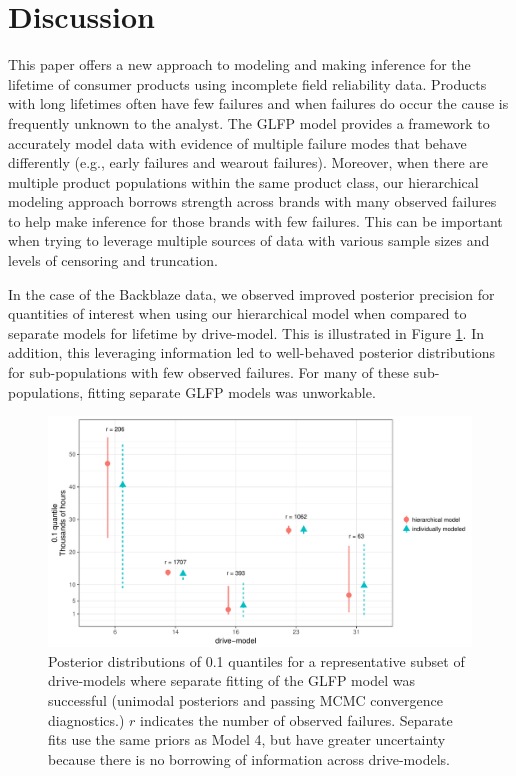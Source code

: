 \documentclass[11pt]{article}
\begin{document}
\section{Discussion}
\label{sec:Discussion}
This paper offers a new approach to modeling and making inference for the lifetime of consumer products using incomplete field reliability data.  Products with long lifetimes often have few failures and when failures do occur the cause is frequently unknown to the analyst.  The GLFP model provides a framework to accurately model data with evidence of multiple failure modes that behave differently (e.g., early failures and wearout failures). Moreover, when there are multiple product populations within the same product class, our hierarchical modeling approach borrows strength across brands with many observed failures to help make inference for those brands with few failures.  This can be important when trying to leverage multiple sources of data with various sample sizes and levels of censoring and truncation.

In the case of the Backblaze data, we observed improved posterior precision for quantities of interest when using our hierarchical model when compared to separate models for lifetime by drive-model. This is illustrated in Figure \ref{improved_accuracy}. In addition, this leveraging information led to well-behaved posterior distributions for sub-populations with few observed failures. For many of these sub-populations, fitting separate GLFP models was unworkable.

\begin{figure}
  \centering
  \includegraphics[width=.7\textwidth]{accuracy_compare}
  \caption{\footnotesize Posterior distributions of 0.1 quantiles for a representative subset of drive-models where separate fitting of the GLFP model was successful (unimodal posteriors and passing MCMC convergence diagnostics.) $r$ indicates the number of observed failures. Separate fits use the same priors as Model 4, but have greater uncertainty because there is no borrowing of information across drive-models.}
  
\label{improved_accuracy}
\end{figure}
\end{document}
